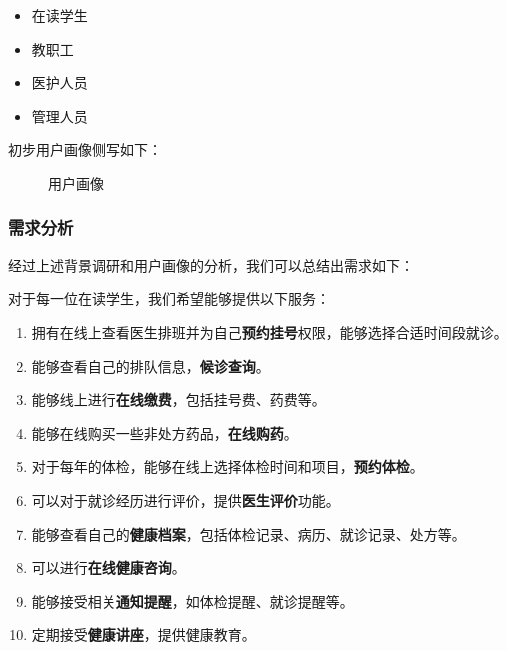 \documentclass{article}
\begin{document}
\begin{itemize}[itemsep=0.01em]
    \item 在读学生
    \item 教职工
    \item 医护人员
    \item 管理人员
\end{itemize}

初步用户画像侧写如下：

\begin{figure}[h]
    \centering
    \caption{用户画像}
\end{figure}

\subsubsection{需求分析}

经过上述背景调研和用户画像的分析，我们可以总结出需求如下：
\vspace{0.5cm}

对于每一位在读学生，我们希望能够提供以下服务：
\begin{enumerate}[itemsep=0.01em]
    \item 拥有在线上查看医生排班并为自己\textbf{预约挂号}权限，能够选择合适时间段就诊。
    \item 能够查看自己的排队信息，\textbf{候诊查询}。
    \item 能够线上进行\textbf{在线缴费}，包括挂号费、药费等。
    \item 能够在线购买一些非处方药品，\textbf{在线购药}。
    \item 对于每年的体检，能够在线上选择体检时间和项目，\textbf{预约体检}。
    \item 可以对于就诊经历进行评价，提供\textbf{医生评价}功能。
    \item 能够查看自己的\textbf{健康档案}，包括体检记录、病历、就诊记录、处方等。
    \item 可以进行\textbf{在线健康咨询}。
    \item 能够接受相关\textbf{通知提醒}，如体检提醒、就诊提醒等。
    \item 定期接受\textbf{健康讲座}，提供健康教育。
\end{enumerate}
\end{document}
